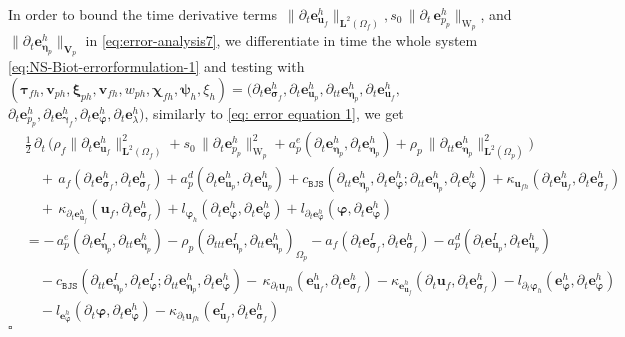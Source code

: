 \documentclass[11pt]{article}
\numberwithin{equation}{section}
\newcommand{\ds}{\displaystyle}
\newcommand{\bgamma}{{\boldsymbol\gamma}}
\newcommand{\bbeta}{{\boldsymbol\eta}}
\newcommand{\bsi}{{\boldsymbol\sigma}}
\newcommand{\bvarphi}{{\boldsymbol\varphi}}
\newcommand{\bpsi}{{\boldsymbol\psi}}
\newcommand{\btau}{{\boldsymbol\tau}}
\newcommand{\bchi}{{\boldsymbol\chi}}
\newcommand{\bxi}{{\boldsymbol\xi}}
\newcommand{\bv}{{\mathbf{v}}}
\newcommand{\bu}{\mathbf{u}}
\newcommand{\be}{{\mathbf{e}}}
\newcommand{\0}{{\mathbf{0}}}
\def\bV{\mathbf{V}}
\newcommand{\bL}{\mathbf{L}}
\def\W{\mathrm{W}}
\def\BJS{\mathtt{BJS}}
\newenvironment{proof}{\noindent{\it Proof.}}{\hfill$\square$}
\numberwithin{equation}{section}
\begin{document}
\begin{proof}
\noindent In order to bound the time derivative terms $\,\|\partial_t\be_{\bu_f}^h\|_{\bL^2(\Omega_f)}, s_0\,\|\partial_t\,\be^h_{p_p} \|_{\W_p}$, and $\|\partial_t\be_{\bbeta_p}^h\|_{\bV_p}$ in \eqref{eq:error-analysis7}, we differentiate in time the whole system \eqref{eq:NS-Biot-errorformulation-1} and testing with $(\btau_{fh}, \bv_{ph}, \bxi_{ph}, \bv_{fh}, w_{ph}, \bchi_{fh}, \bpsi_{h}, \xi_{h}) = (\partial_t\be_{\bsi_f}^h, \partial_t\be_{\bu_p}^h,
\partial_{tt}\be_{\bbeta_p}^h, \partial_t\be_{\bu_f}^h,$ 
$\partial_t\be_{p_p}^h, \partial_t\be_{\bgamma_f}^h, \partial_t\be_{\bvarphi}^h, \partial_t\be_{\lambda}^h)$, similarly to \eqref{eq: error equation 1}, we get 
%
\begin{align}\label{eq: error equation 5}
&\ds\frac{1}{2}\,\partial_t\,\Big( \rho_f\|\partial_t\be_{\bu_f}^h\|^2_{\bL^2(\Omega_f)} 
+ s_0\,\|\partial_t\be_{p_p}^h\|^2_{\W_p} 
+ a^e_p(\partial_t\be_{\bbeta_p}^h,\partial_t\be_{\bbeta_p}^h) 
+ \rho_p\,\|\partial_{tt}\be_{\bbeta_p}^h\|^2_{\bL^2(\Omega_p)} \Big) 
\nonumber \\[1ex]
&\ds\quad +\, a_f(\partial_t\be_{\bsi_f}^h,\partial_t\be_{\bsi_f}^h) 
+ a^d_p(\partial_t\be_{\bu_p}^h,\partial_t\be_{\bu_p}^h) 
+ c_{\BJS}(\partial_{tt}\be_{\bbeta_p}^h, \partial_t\be_{\bvarphi}^h;\partial_{tt}\be_{\bbeta_p}^h, \partial_t\be_{\bvarphi}^h)
+ \kappa_{\bu_{fh}}(\partial_t\be_{\bu_{f}}^h, \partial_t\be_{\bsi_f}^h)
\nonumber \\[1ex]
&\ds\quad +\, \kappa_{\partial_t\be_{\bu_{f}}^h}(\bu_{f}, \partial_t\be_{\bsi_f}^h)
+ l_{\bvarphi_h}(\partial_t\be_{\bvarphi}^h,\partial_t\be_{\bvarphi}^h) 
+ l_{\partial_t\be_{\bvarphi}^h}(\bvarphi,\partial_t\be_{\bvarphi}^h)
\nonumber \\[1ex]
&\ds = -\, a^e_p(\partial_t\be_{\bbeta_p}^I,\partial_{tt}\be_{\bbeta_p}^h) 
-\rho_p(\partial_{ttt}\be_{\bbeta_p}^I,\partial_{tt}\be_{\bbeta_p}^h)_{\Omega_p}
- a_f(\partial_t\be_{\bsi_f}^I,\partial_t\be_{\bsi_f}^h)
-  a^d_p(\partial_t\be_{\bu_p}^I,\partial_t\be_{\bu_p}^h) 
\nonumber \\[1ex]
&\ds\quad - c_{\BJS}(\partial_{tt}\be_{\bbeta_p}^I, \partial_t\be_{\bvarphi}^I;\partial_{tt}\be_{\bbeta_p}^h, \partial_t\be_{\bvarphi}^h) 
-\, \kappa_{\partial_t\bu_{fh}}(\be_{\bu_{f}}^h, \partial_t\be_{\bsi_f}^h)
- \kappa_{\be_{\bu_{f}}^h}(\partial_t\bu_{f}, \partial_t\be_{\bsi_f}^h)
-l_{\partial_t\bvarphi_h}(\be_{\bvarphi}^h,\partial_t\be_{\bvarphi}^h)
\nonumber \\[1ex]
&\ds\quad -l_{\be_{\bvarphi}^h}(\partial_t\bvarphi,\partial_t\be_{\bvarphi}^h)  
- \kappa_{\partial_t\bu_{fh}}(\be_{\bu_{f}}^I, \partial_t\be_{\bsi_f}^h)  

\end{align}
\end{proof}
\end{document}
